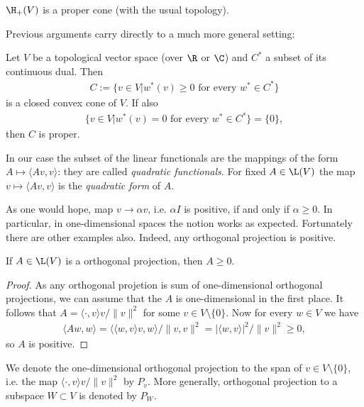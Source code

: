 \begin{lause}\label{basic_positive}
	$\H_{+}(V)$ is a proper cone (with the usual topology).
\end{lause}

Previous arguments carry directly to a much more general setting:

\begin{lause}\label{positive_machine}
	Let $V$ be a topological vector space (over $\R$ or $\C$) and $C^{*}$ a subset of its continuous dual. Then
	\begin{align*}
		C := \{v \in V | w^{*}(v) \geq 0 \text{ for every $w^{*} \in C^{*}$}\}
	\end{align*}
	is a closed convex cone of $V$. If also
	\begin{align*}
		\{v \in V | w^{*}(v) = 0 \text{ for every $w^{*} \in C^{*}$} \} = \{0\},
	\end{align*}
	then $C$ is proper.
\end{lause}

In our case the subset of the linear functionals are the mappings of the form $A \mapsto \langle A v, v \rangle$: they are called \textit{quadratic functionals}. For fixed $A \in \L(V)$ the map $v \mapsto \langle A v, v \rangle$ is the \textit{quadratic form} of $A$.

As one would hope, map $v \to \alpha v$, i.e. $\alpha I$ is positive, if and only if $\alpha \geq 0$. In particular, in one-dimensional spaces the notion works as expected. Fortunately there are other examples also. Indeed, any orthogonal projection is positive.

\begin{prop}
	If $A \in \L(V)$ is a orthogonal projection, then $A \geq 0$.
\end{prop}
\begin{proof}
	As any orthogonal projetion is sum of one-dimensional orthogonal projections, we can assume that the $A$ is one-dimensional in the first place. It follows that $A = \langle \cdot, v \rangle v/\|v\|^2$ for some $v \in V \setminus \{0\}$. Now for every $w \in V$ we have
	\begin{align*}
		\langle A w, w \rangle = \langle \langle w, v \rangle v, w \rangle/\|v, v\|^{2} = |\langle w, v \rangle|^{2}/\|v\|^{2} \geq 0,
	\end{align*}
	so $A$ is positive.
\end{proof}

We denote the one-dimensional orthogonal projection to the span of $v \in V \setminus \{0\}$, i.e. the map $ \langle \cdot, v \rangle v/\|v\|^2$ by $P_{v}$. More generally, orthogonal projection to a subspace $W \subset V$ is denoted by $P_{W}$.

